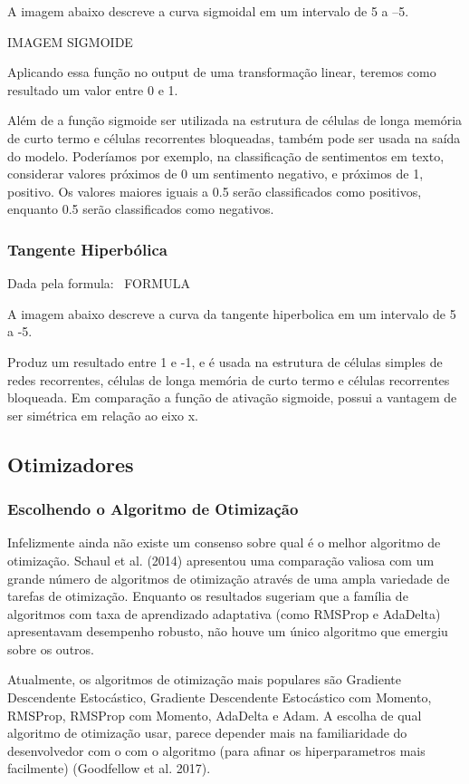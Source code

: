 \documentclass[12pt]{article}
\begin{document}
A imagem abaixo descreve a curva sigmoidal em um intervalo de 5 a –5.

IMAGEM SIGMOIDE

Aplicando essa função no output de uma transformação linear, teremos como resultado um valor entre 0 e 1.

Além de a função sigmoide ser utilizada na estrutura de células de longa memória de curto termo e células recorrentes bloqueadas, também pode ser usada na saída do modelo. Poderíamos por exemplo, na classificação de sentimentos em texto, considerar valores próximos de 0 um sentimento negativo, e próximos de 1, positivo. Os valores maiores iguais a 0.5 serão classificados como positivos, enquanto 0.5 serão classificados como negativos.

\subsubsection{Tangente Hiperbólica}

Dada pela formula:  FORMULA

A imagem abaixo descreve a curva da tangente hiperbolica em um intervalo de 5 a -5.

Produz um resultado entre 1 e -1, e é usada na estrutura de células simples de redes recorrentes, células de longa memória de curto termo e células recorrentes bloqueada. Em comparação a função de ativação sigmoide, possui a vantagem de ser simétrica em relação ao eixo x.

\subsection{Otimizadores}

\subsubsection{Escolhendo o Algoritmo de Otimização}

Infelizmente ainda não existe um consenso sobre qual é o melhor algoritmo de otimização. Schaul et al. (2014) apresentou uma comparação valiosa com um grande número de algoritmos de otimização através de uma ampla variedade de tarefas de otimização. Enquanto os resultados sugeriam que a família de algoritmos com taxa de aprendizado adaptativa (como RMSProp e AdaDelta) apresentavam desempenho robusto, não houve um único algoritmo que emergiu sobre os outros.

Atualmente, os algoritmos de otimização mais populares são Gradiente Descendente Estocástico, Gradiente Descendente Estocástico com Momento, RMSProp, RMSProp com Momento, AdaDelta e Adam. A escolha de qual algoritmo de otimização usar, parece depender mais na familiaridade do desenvolvedor com o com o algoritmo (para afinar os hiperparametros mais facilmente) (Goodfellow et al. 2017).
\end{document}
